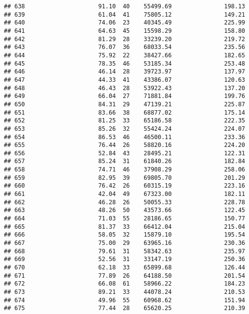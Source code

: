 \documentclass[
]{article}
\begin{document}
\begin{verbatim}
## 638                     91.10  40    55499.69               198.13
## 639                     61.04  41    75805.12               149.21
## 640                     74.06  23    40345.49               225.99
## 641                     64.63  45    15598.29               158.80
## 642                     81.29  28    33239.20               219.72
## 643                     76.07  36    68033.54               235.56
## 644                     75.92  22    38427.66               182.65
## 645                     78.35  46    53185.34               253.48
## 646                     46.14  28    39723.97               137.97
## 647                     44.33  41    43386.07               120.63
## 648                     46.43  28    53922.43               137.20
## 649                     66.04  27    71881.84               199.76
## 650                     84.31  29    47139.21               225.87
## 651                     83.66  38    68877.02               175.14
## 652                     81.25  33    65186.58               222.35
## 653                     85.26  32    55424.24               224.07
## 654                     86.53  46    46500.11               233.36
## 655                     76.44  26    58820.16               224.20
## 656                     52.84  43    28495.21               122.31
## 657                     85.24  31    61840.26               182.84
## 658                     74.71  46    37908.29               258.06
## 659                     82.95  39    69805.70               201.29
## 660                     76.42  26    60315.19               223.16
## 661                     42.04  49    67323.00               182.11
## 662                     46.28  26    50055.33               228.78
## 663                     48.26  50    43573.66               122.45
## 664                     71.03  55    28186.65               150.77
## 665                     81.37  33    66412.04               215.04
## 666                     58.05  32    15879.10               195.54
## 667                     75.00  29    63965.16               230.36
## 668                     79.61  31    58342.63               235.97
## 669                     52.56  31    33147.19               250.36
## 670                     62.18  33    65899.68               126.44
## 671                     77.89  26    64188.50               201.54
## 672                     66.08  61    58966.22               184.23
## 673                     89.21  33    44078.24               210.53
## 674                     49.96  55    60968.62               151.94
## 675                     77.44  28    65620.25               210.39

\end{verbatim}
\end{document}
